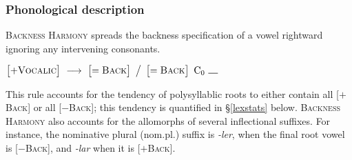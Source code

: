 \subsubsection{Phonological description}

\textsc{Backness Harmony} spreads the backness specification of a vowel rightward ignoring any intervening consonants.

\begin{example}
$\begin{bmatrix} +\textsc{Vocalic} \end{bmatrix}~\goesto~\begin{bmatrix} =\textsc{Back} \end{bmatrix}~\big /~\begin{bmatrix} =\textsc{Back} \end{bmatrix}~\textrm{C}_0~\gap{}$
\end{example}


This rule accounts for the tendency of polysyllablic roots to either contain all [$+$\textsc{Back}] or all [$-$\textsc{Back}];
this tendency is quantified in \S\ref{lexstats} below. \textsc{Backness Harmony} also accounts for the allomorphs of several inflectional suffixes. For instance, the nominative plural (nom.pl.) suffix is \emph{-ler}, when the final root vowel is [$-$\textsc{Back}], and \emph{-lar} when it is [$+$\textsc{Back}]. 


